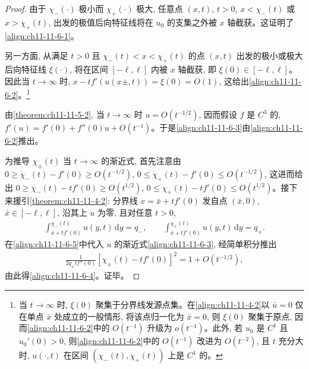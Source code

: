\documentclass[../../main.tex]{subfiles}
\begin{document}
\begin{proof}
由于 $\chi_-(\cdot)$ 极小而 $\chi_+(\cdot)$ 极大, 任意点 $(x,t)$, $t>0$, $x<\chi_-(t)$ 或 $x>\chi_+(t)$, 出发的极值后向特征线将在 $u_0$ 的支集之外被 $x$ 轴截获。这证明了\eqref{align:ch11-11-6-1}。

另一方面, 从满足 $t>0$ 且 $\chi_-(t)<x<\chi_+(t)$ 的点 $(x,t)$ 出发的极小或极大后向特征线 $\xi(\cdot)$, 将在区间 $[-\ell,\ell]$ 内被 $x$ 轴截获, 即 $\xi(0)\in[-\ell,\ell]$。因此当 $t\to\infty$ 时, $x-tf'(u(x\pm,t))=\xi(0)=O(1)$, 这给出\eqref{align:ch11-11-6-2}。\footnote{当 $t\to\infty$ 时, $\xi(0)$ 聚集于分界线发源点集。在\eqref{align:ch11-11-4-2}以 $\bar u=0$ 仅在单点 $\bar x$ 处成立的一般情形, 将该点归一化为 $\bar x=0$, 则 $\xi(0)$ 聚集于原点, 因而\eqref{align:ch11-11-6-2}中的 $O(t^{-1})$ 升级为 $o(t^{-1})$。此外, 若 $u_0$ 是 $C^1$ 且 $u_0'(0)>0$, 则\eqref{align:ch11-11-6-2}中的 $O(t^{-1})$ 改进为 $O(t^{-2})$, 且 $t$ 充分大时, $u(\cdot,t)$ 在区间 $(\chi_-(t),\chi_+(t))$ 上是 $C^1$ 的。}

由\cref{theorem:ch11-11-5-2}, 当 $t\to\infty$ 时 $u=O(t^{-1/2})$, 因而假设 $f$ 是 $C^3$ 的, $f'(u)=f'(0)+f''(0)u+O(t^{-1})$。于是\eqref{align:ch11-11-6-3}由\eqref{align:ch11-11-6-2}推出。

为推导 $\chi_\pm(t)$ 当 $t\to\infty$ 的渐近式, 首先注意由 $0\geqslant\dot\chi_-(t)-f'(0)\geqslant O(t^{-1/2})$, $0\leqslant\dot\chi_+(t)-f'(0)\leqslant O(t^{-1/2})$, 这进而给出 $0\geqslant\chi_-(t)-tf'(0)\geqslant O(t^{1/2})$, $0\leqslant\chi_+(t)-tf'(0)\leqslant O(t^{1/2})$。接下来援引\cref{theorem:ch11-11-4-2}: 分界线 $x=\bar x+tf'(0)$ 发自点 $(\bar x,0)$, $\bar x\in[-\ell,\ell]$, 沿其上 $u$ 为零, 且对任意 $t>0$,
\begin{align}
\int_{\bar x+tf'(0)}^{\chi_-(t)}u(y,t)\,\mathrm{d}y=q_-,\qquad
\int_{\bar x+tf'(0)}^{\chi_+(t)}u(y,t)\,\mathrm{d}y=q_+.\label{align:ch11-11-6-5}
\end{align}
在\eqref{align:ch11-11-6-5}中代入 $u$ 的渐近式\eqref{align:ch11-11-6-3}, 经简单积分推出
\begin{align}
\frac{1}{2q_\pm tf''(0)}[\chi_\pm(t)-tf'(0)]^2=1+O(t^{-1/2}),\label{align:ch11-11-6-6}
\end{align}
由此得\eqref{align:ch11-11-6-4}。证毕。
\end{proof}
\end{document}
